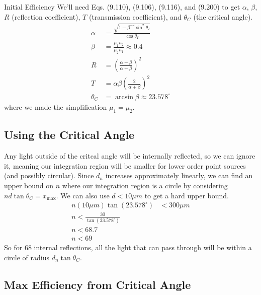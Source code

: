 \documentclass[12pt]{article}
\newcommand{\enterProblemHeader}[1]{
	\rhead{#1}
}
\newenvironment{main_section}[1]{
	\section{#1}
	\enterProblemHeader{#1}
}{
	\pagebreak
}
\begin{document}
\begin{main_section}{Initial Efficiency}
	We'll need Eqs. (9.110), (9.106), (9.116), and (9.200) to get $\alpha$,
	$\beta$, $R$ (reflection coefficient), $T$ (transmission coefficient), and
	$\theta_C$ (the critical angle).
	\begin{align*}
		\alpha &= \frac { \sqrt{1 - \beta^{-2} \sin^2 \theta_I} } {\cos \theta_I}
		\tag{9.110}\\
		\beta &= \frac {\mu_1 n_2} {\mu_2 n_1} \approx 0.4 \tag{9.106}\\
		R &= \left( \frac { \alpha - \beta } { \alpha + \beta } \right)^2
		\tag{9.115}\\
		T &= \alpha \beta \left( \frac 2 {\alpha + \beta} \right)^2\tag{9.116}\\
		\theta_C &= \arcsin \beta \tag{9.200} \approx 23.578^\circ
	\end{align*}
	where we made the simplification $\mu_1 = \mu_2$.

	\subsection{Using the Critical Angle}

	Any light outside of the critcal angle will be internally reflected, so we
	can ignore it, meaning our integration region will be smaller for lower
	order point sources (and possibly circular). Since $d_n$ increases
	approximately linearly, we can find an upper bound on $n$ where our
	integration region is a circle by considering $n d \tan \theta_C =
	x_\text{max}$. We can also use $d < 10 \si{\mu m}$ to get a hard upper
	bound.
	\begin{align*}
		n (10 \si{\mu m}) \tan(23.578^\circ) &< 300 \si{\mu m}\\
		n < \frac {30} {\tan(23.578^\circ)}\\
		n < 68.7\\
		n < 69 %
	\end{align*}
	So for 68 internal reflections, all the light that can pass through will be
	within a circle of radius $d_n \tan \theta_C$.

	\subsection{Max Efficiency from Critical Angle}


\end{main_section}
\end{document}
